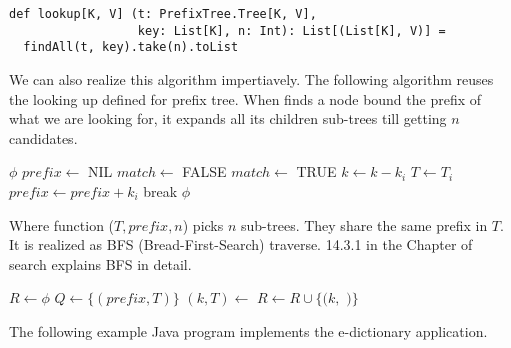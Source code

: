 \documentclass{article}
\begin{document}
\begin{lstlisting}
def lookup[K, V] (t: PrefixTree.Tree[K, V],
                  key: List[K], n: Int): List[(List[K], V)] =
  findAll(t, key).take(n).toList
\end{lstlisting}

We can also realize this algorithm impertiavely.
The following algorithm reuses the looking up defined for prefix tree. When
finds a node bound the prefix of what we are looking for,
it expands all its children sub-trees till getting $n$ candidates.

\begin{algorithmic}[1]
     \State \Return $\phi$
  \EndIf
  \State $prefix \gets$ NIL
  \Repeat
    \State $match \gets$ FALSE
        \State \Return {}
      \EndIf
        \State $match \gets$ TRUE
        \State $k \gets k - k_i$
        \State $T \gets T_i$
        \State $prefix \gets prefix + k_i$
        \State break
      \EndIf
    \EndFor
  \State \Return $\phi$
\EndFunction
\end{algorithmic}

Where function ($T, prefix, n$) picks $n$ sub-trees. They
share the same prefix in $T$. It is realized as BFS (Bread-First-Search) traverse. 14.3.1 in the Chapter of search explains BFS in detail.

\begin{algorithmic}[1]
  \State $R \gets \phi$
  \State $Q \gets \{(prefix, T)\}$
    \State $(k, T) \gets$ 
      \State $R \gets R \cup \{(k, $  $)\}$
    \EndIf
      \State {}
    \EndFor
  \EndWhile
\EndFunction
\end{algorithmic}

The following example Java program implements the e-dictionary application.
\end{document}
